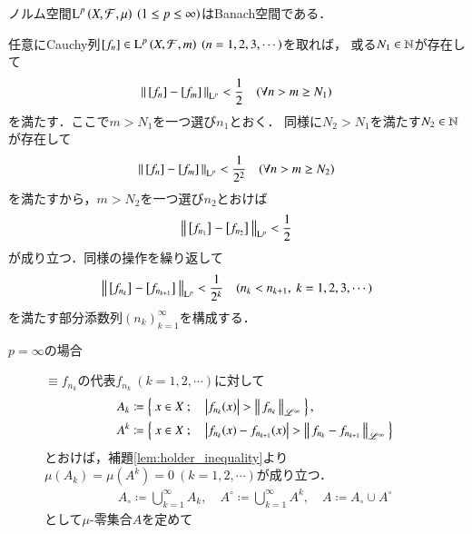 \begin{screen}
	\begin{prp}
		ノルム空間$\operatorname{L}^{p} \left(X,\mathcal{F},\mu\right)\ (1 \leq p \leq \infty)$はBanach空間である．
	\end{prp}
\end{screen}

\begin{prf}
	任意にCauchy列$[f_n] \in \operatorname{L}^{p} \left(X,\mathcal{F},m\right)\ (n=1,2,3,\cdots)$を取れば，
	或る$N_1 \in \mathbb{N}$が存在して
	\begin{align}
		\left\|\, [f_n]-[f_m]\, \right\|_{\mathrm{L}^p} < \frac{1}{2}
		\quad (\forall n > m \geq N_1)
	\end{align}
	を満たす．ここで$m > N_1$を一つ選び$n_1$とおく．
	同様に$N_2 > N_1$を満たす$N_2 \in \mathbb{N}$が存在して
	\begin{align}
		\left\|\, [f_n]-[f_m]\, \right\|_{\mathrm{L}^p} < \frac{1}{2^2}
		\quad (\forall n > m \geq N_2)
	\end{align}
	を満たすから，$m > N_2$を一つ選び$n_2$とおけば
	\begin{align}
		\left\|\, \left[f_{n_1}\right]_{} - \left[f_{n_2}\right]_{}\, \right\|_{\mathrm{L}^p} < \frac{1}{2}
	\end{align}
	が成り立つ．同様の操作を繰り返して
	\begin{align}
		\left\|\, \left[f_{n_k}\right]_{} - \left[f_{n_{k+1}}\right]_{}\, \right\|_{\mathrm{L}^p} < \frac{1}{2^k} 
		\quad (n_k < n_{k+1},\ k=1,2,3,\cdots) \label{ineq:Lp_banach_2}
	\end{align}
	を満たす部分添数列$(n_k)_{k=1}^{\infty}$を構成する．
	\begin{description}
		\item[$p = \infty$の場合]
			$\equiv{f_{n_k}}{}$の代表$f_{n_k}\ (k=1,2,\cdots)$に対して
			\begin{align}
				A_k &\coloneqq \left\{\ x \in X\ ;\quad \left| f_{n_k}(x) \right| > \left\|\, f_{n_k}\, \right\|_{\mathscr{L}^\infty}\ \right\}, \\
				A^k &\coloneqq \left\{\ x \in X\ ;\quad \left| f_{n_k}(x) - f_{n_{k+1}}(x) \right| > \left\|\, f_{n_k} - f_{n_{k+1}}\, \right\|_{\mathscr{L}^\infty}\ \right\}
			\end{align}
			とおけば，補題\ref{lem:holder_inequality}より$\mu(A_k) = \mu(A^k) = 0\ (k=1,2,\cdots)$が成り立つ．
			\begin{align}
				A_\circ \coloneqq \bigcup_{k=1}^{\infty} A_k,
				\quad A^\circ \coloneqq \bigcup_{k=1}^{\infty}A^k,
				\quad A \coloneqq A_\circ \cup A^\circ
			\end{align}
			として$\mu$-零集合$A$を定めて
			\begin{align}

\end{align}
\end{description}
\end{prf}
